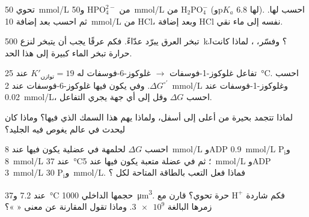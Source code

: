 \begin{exercise}[$\star\star$]\label{exo:b1:water-small-molecules:6}
 تحوي \qty{50}{mmol/L} من $\mathrm{HPO_4^{2-}}$
و\qty{50}{mmol/L} من $\mathrm{H_2PO_4^-}$ (وp$K_a$ لها 6.8). احسب
 لها. ثم احسب  بعد إضافة \qty{10}{mmol/L} من HCl، وبعد إضافة
HCl نفسه إلى ماء نقي.
\end{exercise}

\begin{exercise}[$\star\star$]\label{exo:b1:water-small-molecules:7}
تبخر العرق يبرّد عدّاءً. فكم عرقًا يجب أن يتبخر لنزع \qty{500}{kJ}؟
وفسّر، ، لماذا كانت حرارة تبخر الماء كبيرة إلى
هذا الحد.
\end{exercise}

\begin{exercise}[$\star\star$]\label{exo:b1:water-small-molecules:8}
تفاعل غلوكوز-1-فوسفات $\to$ غلوكوز-6-فوسفات له
$K'_{\text{توازن}} = 19$ عند \qty{25}{\celsius}. احسب
$\Delta G^{\circ\prime}$. وفي  يكون فيها غلوكوز-6-فوسفات عند
\qty{2}{mmol/L} وغلوكوز-1-فوسفات عند \qty{0.02}{mmol/L}، احسب
$\Delta G$ وقل إلى أي جهة يجري التفاعل.
\end{exercise}

\begin{exercise}[$\star\star$]\label{exo:b1:water-small-molecules:9}
لماذا تتجمد بحيرة من أعلى إلى أسفل، ولماذا يهم هذا السمك الذي فيها؟
وماذا كان ليحدث في عالم يغوص فيه الجليد؟
\end{exercise}

\begin{exercise}[$\star\star\star$]\label{exo:b1:water-small-molecules:10}
احسب $\Delta G$ لحلمهة  في  عضلية يكون فيها  عند
\qty{8}{mmol/L} وADP \qty{0.9}{mmol/L} و$\mathrm{P_i}$
\qty{8}{mmol/L} عند \qty{37}{\celsius}؛ ثم في عضلة متعبة يكون فيها
 عند \qty{5}{mmol/L} وADP \qty{3}{mmol/L} و$\mathrm{P_i}$
\qty{30}{mmol/L}. فماذا فعل التعب بالطاقة المتاحة لكل ؟
\end{exercise}

\begin{exercise}[$\star\star\star$]\label{exo:b1:water-small-molecules:11}
 عند  7.2 و\qty{37}{\celsius} حجمها الداخلي
\qty{1000}{\micro m^3}. فكم شاردة $\mathrm{H^+}$ حرة تحوي؟ قارن مع
زمرها  البالغة $\num{3e9}$. وماذا تقول المقارنة عن معنى
« »؟
\end{exercise}

